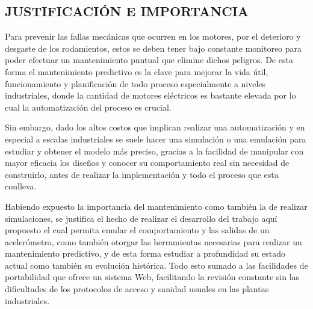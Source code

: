 \subsection{JUSTIFICACIÓN E IMPORTANCIA}

Para prevenir las fallas mecánicas que ocurren en los motores, por el deterioro
y desgaste de los rodamientos, estos se deben tener bajo constante monitoreo
para poder efectuar un mantenimiento puntual que elimine dichos peligros. De
esta forma el mantenimiento predictivo es la clave para mejorar la vida útil,
funcionamiento y planificación de todo proceso especialmente a niveles
industriales, donde la cantidad de motores eléctricos es bastante elevada
por lo cual la automatización del proceso es crucial.

Sin embargo, dado los altos costos que implican realizar una automatización y
en especial a escalas industriales se suele hacer una simulación o una
emulación para estudiar y obtener el modelo más preciso, gracias a la facilidad
de manipular con mayor eficacia los diseños y conocer su comportamiento real
sin necesidad de construirlo, antes de realizar la implementación y todo el
proceso que esta conlleva.

Habiendo expuesto la importancia del mantenimiento como también la de realizar
simulaciones, se justifica el hecho de realizar el desarrollo del trabajo aquí
propuesto el cual permita emular el comportamiento y las salidas de un
acelerómetro, como también otorgar las herramientas necesarias para
realizar un mantenimiento predictivo, y de esta forma estudiar a
profundidad su estado actual como también su evolución histórica. Todo esto
sumado a las facilidades de portabilidad que ofrece un sistema Web, facilitando
la revisión constante sin las dificultades de los protocolos de acceso y
sanidad usuales en las plantas industriales.
